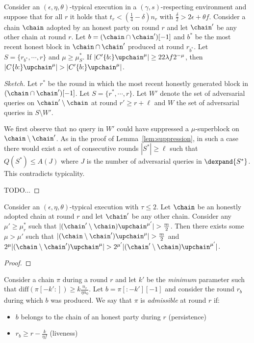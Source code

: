 \begin{theorem}\label{thm:varscp}
  Consider an $(\epsilon, \eta, \theta)$-typical execution in a
  $(\gamma, s)$-respecting environment and suppose that for all $r$ it holds
  that $t_r < (\frac{1}{4} - \delta)n_r$ with
  $\frac{\delta}{2} > 2\epsilon + \theta f$.
  Consider a chain $\chain$ adopted by an honest party on round $r$ and let
  $\chain'$ be any other chain at round $r$. Let $b =
  (\chain\cap\chain')[-1]$ and $b^*$ be the most recent honest block in
  $\chain\cap\chain'$ produced at round $r_{b^*}$. Let $S = \{ r_{b^*}, \cdots,
  r \}$ and $\mu \geq \mu^*_S$. If $|C'\{b{:}\}\upchain^\mu| \geq 22\lambda
  f 2^{-\mu}$, then $|C\{b{:}\}\upchain^\mu| >
  |C'\{b{:}\}\upchain^\mu|$.
\end{theorem}
\begin{proof}[Sketch]
  Let $r^*$ be the round in which the most recent honestly generated block in
  $(\chain \cap \chain')[-1]$.
  Let $S = \{r^*, \cdots, r\}$. Let $W'$ denote the set of adversarial queries
  on $\chain' \setminus \chain$ at round $r' \geq r + \ell$ and
  $W$ the set of adversarial queries in $S \setminus W'$.

  We first observe that no query in $W'$ could have suppressed a
  $\mu$-superblock on $\chain\setminus\chain'$. As in the proof of
  Lemma~\ref{lem:suppression}, in such a case there would exist a set of consecutive
  rounds $|S^*| \geq \ell$ such that $Q(S^*) \leq A(J)$ where $J$ is the number
  of adversarial queries in $\dexpand{S^*}$. This contradicts typicality.

  TODO...
\end{proof}

\begin{conjecture}
  Consider an $(\epsilon, \eta, \theta)$-typical execution with $\tau \leq 2$.
  Let $\chain$ be an honestly adopted chain at round $r$ and let $\chain'$ be
  any other chain. Consider any $\mu' \geq \mu^*_r$ such that
  $|(\chain'\setminus\chain)\upchain^{\mu'}| > \frac{m}{2}$. Then there exists
  some $\mu > \mu'$ such that $|(\chain\setminus\chain')\upchain^\mu| >
  \frac{m}{2}$ and $2^\mu|(\chain\setminus\chain')\upchain^\mu| >
  2^{\mu'}|(\chain'\setminus\chain)\upchain^{\mu'}|$.
\end{conjecture}
\begin{proof}
\end{proof}

\begin{definition}
  Consider a chain $\pi$ during a round $r$ and let $k'$
  be the \emph{minimum} parameter such that
  $\text{diff}(\pi[-k':]) \geq k \frac{n_r}{\eta n_0}$.
  Let $b = \pi[:-k'][-1]$ and consider the round $r_b$ during
  which $b$ was produced.
  We say that $\pi$ is \emph{admissible} at round $r$ if:
  \begin{itemize}
    \item $b$ belongs to the chain of an honest party during $r$ (persistence)
    \item $r_b \geq r - \frac{k}{\eta f}$ (liveness)
  \end{itemize}
\end{definition}

